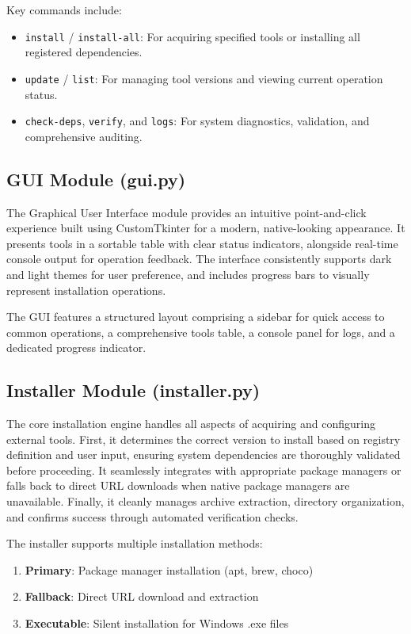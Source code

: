 \documentclass[12pt,a4paper]{report}
\begin{document}
Key commands include:
\begin{itemize}
    \item \texttt{install} / \texttt{install-all}: For acquiring specified tools or installing all registered dependencies.
    \item \texttt{update} / \texttt{list}: For managing tool versions and viewing current operation status.
    \item \texttt{check-deps}, \texttt{verify}, and \texttt{logs}: For system diagnostics, validation, and comprehensive auditing.
\end{itemize}

\subsection{GUI Module (gui.py)}
The Graphical User Interface module provides an intuitive point-and-click experience built using CustomTkinter for a modern, native-looking appearance. It presents tools in a sortable table with clear status indicators, alongside real-time console output for operation feedback. The interface consistently supports dark and light themes for user preference, and includes progress bars to visually represent installation operations.

The GUI features a structured layout comprising a sidebar for quick access to common operations, a comprehensive tools table, a console panel for logs, and a dedicated progress indicator.

\subsection{Installer Module (installer.py)}
The core installation engine handles all aspects of acquiring and configuring external tools. First, it determines the correct version to install based on registry definition and user input, ensuring system dependencies are thoroughly validated before proceeding. It seamlessly integrates with appropriate package managers or falls back to direct URL downloads when native package managers are unavailable. Finally, it cleanly manages archive extraction, directory organization, and confirms success through automated verification checks.

The installer supports multiple installation methods:
\begin{enumerate}
    \item \textbf{Primary}: Package manager installation (apt, brew, choco)
    \item \textbf{Fallback}: Direct URL download and extraction
    \item \textbf{Executable}: Silent installation for Windows .exe files
\end{enumerate}
\end{document}
